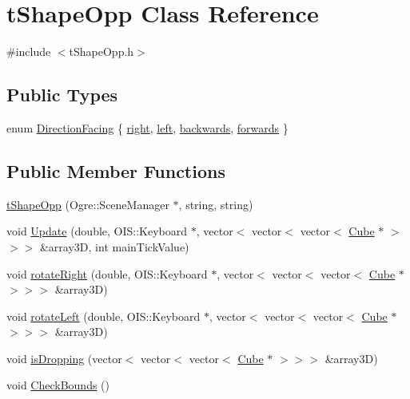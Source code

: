 \hypertarget{classt_shape_opp}{\section{t\-Shape\-Opp Class Reference}
\label{classt_shape_opp}
}


{\ttfamily \#include $<$t\-Shape\-Opp.\-h$>$}

\subsection*{Public Types}
\begin{DoxyCompactItemize}
\item 
enum \hyperlink{classt_shape_opp_a066c267390282f939cd988fadd2e3516}{Direction\-Facing} \{ \hyperlink{classt_shape_opp_a066c267390282f939cd988fadd2e3516ae8e3655442885a1fe4b2d4951b3c1767}{right}, 
\hyperlink{classt_shape_opp_a066c267390282f939cd988fadd2e3516a8764600d2854435bef463aa469ac1ac9}{left}, 
\hyperlink{classt_shape_opp_a066c267390282f939cd988fadd2e3516a1ce45a471c6ed53c1474ff7894ea0379}{backwards}, 
\hyperlink{classt_shape_opp_a066c267390282f939cd988fadd2e3516a2a7d593d8ee3566010d630176832245c}{forwards}
 \}
\end{DoxyCompactItemize}
\subsection*{Public Member Functions}
\begin{DoxyCompactItemize}
\item 
\hyperlink{classt_shape_opp_a81365e8a9906035bf34f5b5f56b68e48}{t\-Shape\-Opp} (Ogre\-::\-Scene\-Manager $\ast$, string, string)
\item 
void \hyperlink{classt_shape_opp_aa0cf574d15ff12b0c93ba341f56245e4}{Update} (double, O\-I\-S\-::\-Keyboard $\ast$, vector$<$ vector$<$ vector$<$ \hyperlink{class_cube}{Cube} $\ast$ $>$$>$$>$ \&array3\-D, int main\-Tick\-Value)
\item 
void \hyperlink{classt_shape_opp_a4c7791edd5968486a0507f169320056b}{rotate\-Right} (double, O\-I\-S\-::\-Keyboard $\ast$, vector$<$ vector$<$ vector$<$ \hyperlink{class_cube}{Cube} $\ast$ $>$$>$$>$ \&array3\-D)
\item 
void \hyperlink{classt_shape_opp_a91addaaf2c83610b0d0239c9df906282}{rotate\-Left} (double, O\-I\-S\-::\-Keyboard $\ast$, vector$<$ vector$<$ vector$<$ \hyperlink{class_cube}{Cube} $\ast$ $>$$>$$>$ \&array3\-D)
\item 
void \hyperlink{classt_shape_opp_acdfea913b9c1928a1809a03a86ddd3b7}{is\-Dropping} (vector$<$ vector$<$ vector$<$ \hyperlink{class_cube}{Cube} $\ast$ $>$$>$$>$ \&array3\-D)
\item 
void \hyperlink{classt_shape_opp_aeb23e299c01ad10e4d6cabdc753e5b6d}{Check\-Bounds} ()
\end{DoxyCompactItemize}
